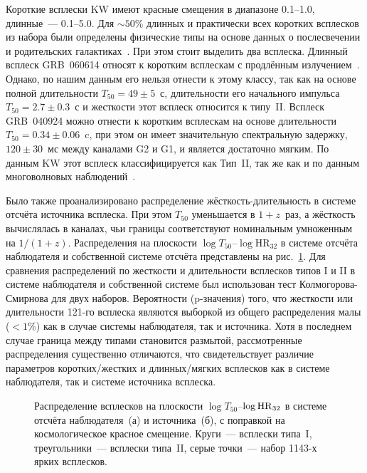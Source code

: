 Короткие всплески KW имеют красные смещения в диапазоне 0.1--1.0, длинные~--- 0.1--5.0.
Для $\sim 50$\% длинных и практически всех коротких всплесков из набора были 
определены физические типы на основе данных о послесвечении и родительских 
галактиках~\citep{Zhang_2009, Kann_2010ApJ, Kann_2011ApJ}.
При этом стоит выделить два всплеска. 
Длинный всплеск GRB~060614 относят к коротким всплескам с продлённым излучением~\citep{Gehrels_2006_Nature}. 
Однако, по нашим данным его нельзя отнести к этому классу, так как на основе полной 
длительности $T_{50} = 49 \pm 5$~с, длительности его начального импульса 
$T_{50} = 2.7\pm 0.3$~с и жесткости этот всплеск относится к типу~II.
Всплеск GRB~040924 можно отнести к коротким всплескам на основе длительности $T_{50} = 0.34\pm0.06$~c, 
при этом он имеет значительную спектральную задержку, $120 \pm 30$~мс между каналами G2 и G1, 
и является достаточно мягким. По данным KW этот всплеск классифицируется как Тип~II, 
так же как и по данным многоволновых наблюдений~\citep{Zhang_2009}.

Было также проанализировано распределение  жёсткость-длительность в системе 
отсчёта источника всплеска. При этом $T_{50}$ уменьшается в $1+z$~раз, а жёсткость 
вычислялась в каналах, чьи границы соответствуют номинальным умноженным на $1/(1+z)$. 
Распределения на плоскости $\log T_{50}$--$\log \mbox{HR}_{32}$ в системе отсчёта наблюдателя 
и собственной системе отсчёта представлены на рис.~\ref{img:T50HRzCorr}. 
Для сравнения распределений по жесткости и длительности всплесков типов I и II
в системе наблюдателя и собственной системе был использован тест Колмогорова-Смирнова для двух наборов. 
Вероятности (p-значения) того, что жесткости или длительности 
121-го всплеска являются выборкой из общего распределения малы ($<1$\%) 
как в случае системы наблюдателя, так и источника. Хотя в последнем случае
граница между типами становится размытой, рассмотренные распределения существенно отличаются,
что свидетельствует различие параметров коротких/жестких и длинных/мягких всплесков как 
в системе наблюдателя, так и системе источника всплеска. 

\begin{figure}[h]
  \begin{minipage}[h]{0.5\textwidth}
  \end{minipage}
  \hfill
  \begin{minipage}[h]{0.5\textwidth}
  \end{minipage}
  \caption{Распределение всплесков на плоскости $\log T_{50}$--$\log {\mathrm{HR}}_{32}$ 
  в системе отсчёта наблюдателя~(а) и источника~(б), с поправкой на космологическое красное смещение. 
  Круги~--- всплески типа~I, треугольники~--- всплески типа~II, 
  серые точки~--- набор 1143-х ярких всплесков.
  }
  \label{img:T50HRzCorr}  
\end{figure}

